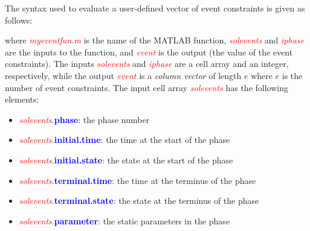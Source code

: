 \documentclass[10pt,final]{report}
\newcommand{\bfblue}[1]{\textcolor{blue}{\bf #1}}
\newcommand{\slred}[1]{\textcolor{red}{\sl #1}}
\begin{document}
The syntax used to evaluate a user-defined vector of event constraints
is given as follows:
\begin{center}
\end{center}
{\noindent}where \slred{myeventfun.m} is the name of the MATLAB function,
\slred{solevents} and \slred{iphase} are the inputs to the function, and
\slred{event} is the output (\ie the value of the event constraints).
The inputs \slred{solevents} and \slred{iphase} are a cell array and
an integer, respectively, while the output \slred{event} is a
{\em column vector} of length $e$ where $e$ is the number of event
constraints.  The input cell array \slred{solevents} has the following elements:
\begin{itemize}
  \item \slred{solevents}.\bfblue{phase}:  the phase number
  \item \slred{solevents}.\bfblue{initial.time}:  the time at the start of the phase
  \item \slred{solevents}.\bfblue{initial.state}:  the state at the start of the phase
  \item \slred{solevents}.\bfblue{terminal.time}:  the time at the terminus of the phase
  \item \slred{solevents}.\bfblue{terminal.state}:  the state at the terminus of the phase
  \item \slred{solevents}.\bfblue{parameter}:  the static parameters in the phase
\end{itemize}
\end{document}
